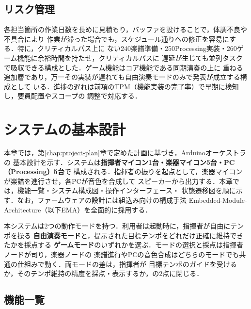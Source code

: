 \documentclass[lualatex,book,paper=a4paper,jafontsize=11.5pt,jafontscale=1.05]{jlreq}
\begin{document}
\section{リスク管理}\label{sec:risk}
各担当箇所の作業日数を長めに見積もり，バッファを設けることで，体調不良や不具合により
作業が滞った場合でも，スケジュール通りへの修正を容易にする．特に，クリティカルパス上に
ない240楽譜準備・250Processing実装・260ゲーム機能に余裕時間を持たせ，クリティカルパスに
遅延が生じても並列タスクで吸収できる構成とした．ゲーム機能はコア機能である同期演奏の上に
重ねる追加層であり，万一その実装が遅れても自由演奏モードのみで発表が成立する構成として
いる．進捗の遅れは前項のTPM（機能実装の完了率）で早期に検知し，要員配置やスコープの
調整で対応する．

\chapter{システムの基本設計}\label{chap:basic-design}

本章では，第\ref{chap:project-plan}章で定めた計画に基づき，Arduinoオーケストラの
基本設計を示す．システムは\textbf{指揮者マイコン1台・楽器マイコン5台・PC（Processing）5台}で
構成される．指揮者の振りを起点として，楽器マイコンが楽譜を進行させ，各PCが音色を合成して
スピーカーから出力する．本章では，機能一覧・システム構成図・操作インターフェース・
状態遷移図を順に示す．なお，ファームウェアの設計には組込み向けの構成手法
Embedded-Module-Architecture（以下EMA）を全面的に採用する．

本システムは2つの動作モードを持つ．利用者は起動時に，指揮者が自由にテンポを操る
\textbf{自由演奏モード}と，提示された目標テンポをどれだけ正確に維持できたかを採点する
\textbf{ゲームモード}のいずれかを選ぶ．モードの選択と採点は指揮者ノードが司り，楽器ノードの
楽譜進行やPCの音色合成はどちらのモードでも共通の仕組みで動く．両モードの差は，指揮者が
目標テンポのガイドを受けるか，そのテンポ維持の精度を採点・表示するか，の2点に閉じる．

\section{機能一覧}\label{sec:basic-functions}
\end{document}
